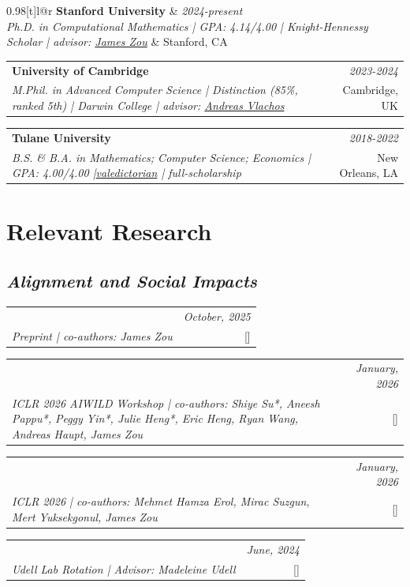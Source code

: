 \documentclass[a4paper,11pt]{article}
\makeatletter
\newcommand{\resumeSubheading}[4]{
\vspace{0.5mm}
    \begin{tabular*}{0.98\textwidth}[t]{l@{\extracolsep{\fill}}r}
        \textbf{#1} & \textit{\footnotesize{#4}} \\
        \textit{\footnotesize{#3}} &  \footnotesize{#2}\\
    \end{tabular*}
    \vspace{-1mm}
}
\newcommand{\resumeProject}[4]{
\vspace{0mm}
    \begin{tabular*}{0.98\textwidth}[t]{l@{\extracolsep{\fill}}r}
        \text{#1} & \textit{\footnotesize{#3}} \\
        \footnotesize{\textit{#2}} & \footnotesize{#4}
    \end{tabular*}
    \vspace{-0mm}
}
\makeatother
\begin{document}
\resumeSubheading
{Stanford University}{Stanford, CA}
{Ph.D. in Computational Mathematics  | GPA: 4.14/4.00 | Knight-Hennessy Scholar | advisor: \href{https://scholar.google.com/citations?user=23ZXZvEAAAAJ&hl=en}{James Zou}}{2024-present}
\vspace{3mm}
\resumeSubheading
{University of Cambridge}{Cambridge, UK}
{M.Phil. in Advanced Computer Science |  Distinction (85\%, ranked 5th) | Darwin College | advisor: \href{https://andreasvlachos.github.io/}{Andreas Vlachos} }{2023-2024}
\vspace{3mm}
\resumeSubheading
{Tulane University}{New Orleans, LA}
{B.S. \& B.A. in Mathematics; Computer Science; Economics | GPA: 4.00/4.00 |\href{https://college.tulane.edu/newcomb-tulane-college-announces-class-2022-william-wallace-peery-society}{valedictorian} | full-scholarship}{2018-2022}
\vspace{3mm}

\vspace{-4mm}

\section{\textbf{Relevant Research}}
\subsection*{\textit{Alignment and Social Impacts}}
\vspace{-2mm}
\resumeProject
  {Moloch's Bargain: Emergent Misalignment When LLMs Compete for Audiences}
  {Preprint | co-authors: James Zou}
  {October, 2025}
  {{}[\href{https://arxiv.org/abs/2510.06105}{\textcolor{darkblue}{\faGithub}}]}
\resumeProject
  {Position: AI Development Should Prioritize Cognitive Security}
  {ICLR 2026 AIWILD Workshop | co-authors: Shiye Su*, Aneesh Pappu*, Peggy Yin*, Julie Heng*, Eric Heng, Ryan Wang, Andreas Haupt, James Zou}
  {January, 2026}
  {{}[\href{https://www.cstf.dev/}{\textcolor{darkblue}{\faIcon{globe}}}]}
\resumeProject
  {Cost-of-Pass: An Economic Framework for Evaluating Language Models}
  {ICLR 2026 | co-authors: Mehmet Hamza Erol, Mirac Suzgun, Mert Yuksekgonul, James Zou}
  {January, 2026}
  {{}[\href{https://arxiv.org/abs/2504.13359}{\textcolor{darkblue}{\faGithub}}]}
\resumeProject
  {BiTextion: Sociotechnical Alignment in Automated Optimization Modeling via Textual Bisection}
  {Udell Lab Rotation | Advisor: Madeleine Udell}
  {June, 2024}
  {{}[\href{https://github.com/batu-el/bitextion}{\textcolor{darkblue}{\faGithub}}]}
\vspace{-4mm}
\end{document}
